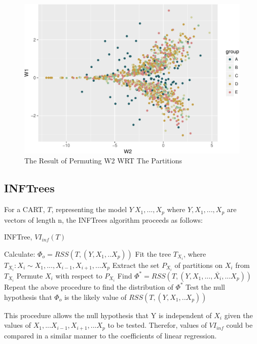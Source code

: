 \documentclass[12pt,twoside]{reedthesis}
\begin{document}
  \begin{figure}[htbp]
  \centering
  \includegraphics{Thesis_files/figure-latex/p5ch4-1.pdf}
  \caption{\label{fig:p5ch4}The Result of Permuting W2 WRT The Partitions}
  \end{figure}
  
  \subsection{INFTrees}\label{inftrees}
  
  For a CART, \(T\), representing the model \(Y~X_1,...,X_p\) where
  \(Y,X_1,...,X_p\) are vectors of length n, the INFTrees algorithm
  proceeds as follows:
  
  \begin{algorithm}
  \caption{INFTree, $VI_{inf}(T)$}
  \label{inftree}
  \begin{algorithmic}
  \State Calculate: $\Phi_o =  RSS(T, (Y,X_1,..X_p))$
  \State Fit the tree $T_{X_i}$, where $T_{X_i} : X_i \sim X_1,...,X_{i-1}, X_{i+1},...X_p$
  \State Extract the set $P_{X_i}$ of partitions on $X_i$ from $T_{X_i}$
  \State Permute $X_i$ with respect to $P_{X_i}$
  \State Find $\Phi^* =  RSS(T, (Y,X_1,..., \bar{X_i},...X_p))$
  \State Repeat the above procedure to find the distribution of $\Phi^*$
  \State Test the null hypothesis that $\Phi_o$ is the likely value of $RSS(T, (Y,X_1,..X_p))$
  \EndFor
  \end{algorithmic}
  \end{algorithm}
  
  This procedure allows the null hypothesis that Y is independent of
  \(X_i\) given the values of \(X_1,...X_{i-1},X_{i+1},...X_p\) to be
  tested. Therefor, values of \(VI_{inf}\) could be compared in a similar
  manner to the coefficients of linear regression.
  
\end{document}
